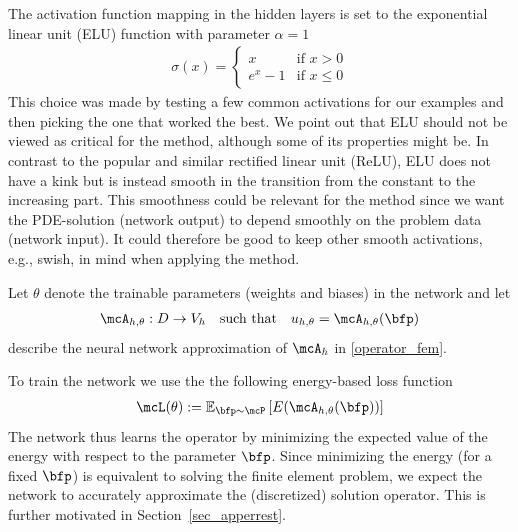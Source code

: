 \documentclass[12pt]{article}
\begin{document}
The activation function mapping in the hidden layers is set to the exponential linear unit (ELU) function with parameter $\alpha = 1$
\begin{align}
	\sigma(x) = \begin{cases}
	x \quad &\text{if } x >0 \\
	e^x - 1 	&\text{if } x \leq 0
	\end{cases}
\end{align}
This choice was made by testing a few common activations for our examples and then picking the one that worked the best. We point out that ELU should not be viewed as critical for the method, although some of its properties might be. In contrast to the popular and similar rectified linear unit (ReLU), ELU does not have a kink but is instead smooth in the transition from the constant to the increasing part. This smoothness could be relevant for the method since we want the PDE-solution (network output) to depend smoothly on the problem data (network input). It could therefore be good to keep other smooth activations, e.g., swish, in mind when applying the method.

Let $\theta$ denote the trainable parameters (weights and biases) in the network and let
\begin{align}
	\mcA_{h,\theta}:D \to V_h \quad \text{such that} \quad u_{h,\theta} = \mcA_{h,\theta}(\bfp)
\end{align}
describe the neural network approximation of $\mcA_{h}$ in \eqref{operator_fem}.

To train the network we use the the following energy-based loss function
\begin{align}
	\mcL(\theta) := \mathbb{E}_{\bfp \sim \mcP} \left[ E(\mcA_{h,\theta}(\bfp))  \right] \label{loss_fcn_full}
\end{align}
The network thus learns the operator by minimizing the expected value of the energy with respect to the parameter $\bfp$. Since minimizing the energy (for a fixed $\bfp$) is equivalent to solving the finite element problem, we expect the network to accurately approximate the (discretized) solution operator. This is further motivated in Section~\ref{sec_apperrest}.
\end{document}
